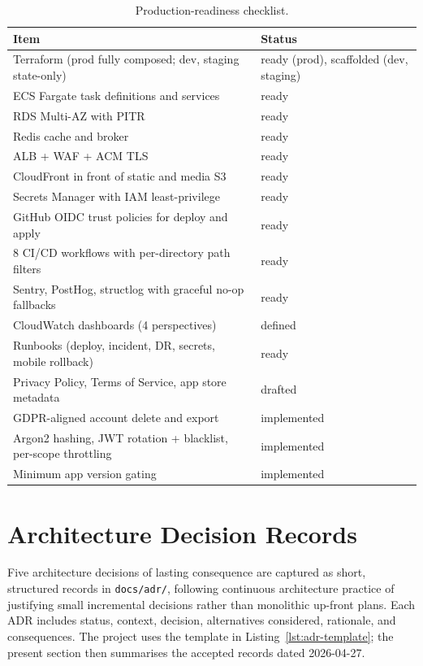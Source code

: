 \begin{table}[H]
\centering
\small
\caption{Production-readiness checklist.}
\label{tab:prodready}
\begin{tabularx}{\textwidth}{|X|p{2.8cm}|}
\hline
Item & Status \\
\hline
Terraform (prod fully composed; dev, staging state-only) & ready (prod), scaffolded (dev, staging) \\
ECS Fargate task definitions and services & ready \\
RDS Multi-AZ with PITR & ready \\
Redis cache and broker & ready \\
ALB + WAF + ACM TLS & ready \\
CloudFront in front of static and media S3 & ready \\
Secrets Manager with IAM least-privilege & ready \\
GitHub OIDC trust policies for deploy and apply & ready \\
8 CI/CD workflows with per-directory path filters & ready \\
Sentry, PostHog, structlog with graceful no-op fallbacks & ready \\
CloudWatch dashboards (4 perspectives) & defined \\
Runbooks (deploy, incident, DR, secrets, mobile rollback) & ready \\
Privacy Policy, Terms of Service, app store metadata & drafted \\
GDPR-aligned account delete and export & implemented \\
Argon2 hashing, JWT rotation + blacklist, per-scope throttling & implemented \\
Minimum app version gating & implemented \\
\hline
\end{tabularx}
\end{table}

\section{Architecture Decision Records}

Five architecture decisions of lasting consequence are captured as short, structured records in \texttt{docs/adr/}, following continuous architecture practice \cite{erder2015} of justifying small incremental decisions rather than monolithic up-front plans. Each ADR includes status, context, decision, alternatives considered, rationale, and consequences. The project uses the template in Listing~\ref{lst:adr-template}; the present section then summarises the accepted records dated 2026-04-27.

